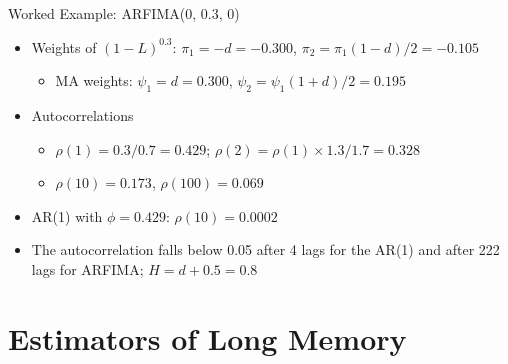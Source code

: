 \begin{frame}{Worked Example: ARFIMA(0, 0.3, 0)}
\itemsize{\small}
\begin{itemize}
    \item Weights of $(1 - L)^{0.3}$: $\pi_1 = -d = -0.300$, $\pi_2 = \pi_1(1 - d)/2 = -0.105$
    \begin{itemize}
        \item MA weights: $\psi_1 = d = 0.300$, $\psi_2 = \psi_1(1 + d)/2 = 0.195$
    \end{itemize}
    \item Autocorrelations
    \begin{itemize}
        \item $\rho(1) = 0.3/0.7 = 0.429$; $\rho(2) = \rho(1) \times 1.3/1.7 = 0.328$
        \item $\rho(10) = 0.173$, $\rho(100) = 0.069$
    \end{itemize}
    \item AR(1) with $\phi = 0.429$: $\rho(10) = 0.0002$
    \item The autocorrelation falls below 0.05 after 4 lags for the AR(1) and after 222 lags for ARFIMA; $H = d + 0.5 = 0.8$
\end{itemize}
\end{frame}


\section{Estimators of Long Memory}


